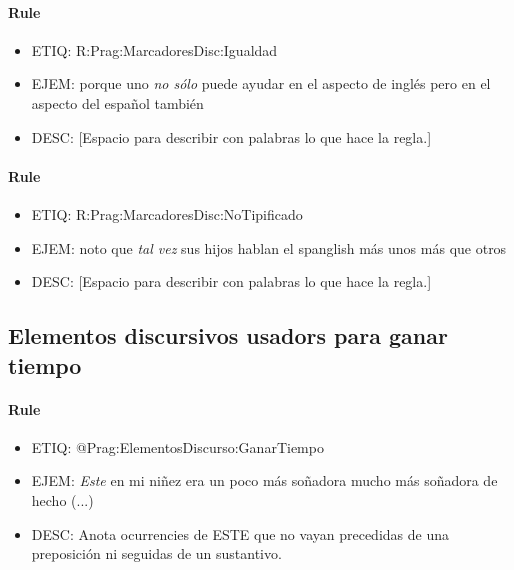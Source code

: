 \documentclass[11pt]{report}
\begin{document}
\paragraph*{Rule}
\begin{itemize}
\item ETIQ: R:Prag:MarcadoresDisc:Igualdad
\item EJEM: porque uno \emph{no sólo} puede ayudar en el aspecto de inglés pero en el aspecto del español también
\item DESC: [Espacio para describir con palabras lo que hace la regla.]
\end{itemize}

\paragraph*{Rule}
\begin{itemize}
\item ETIQ: R:Prag:MarcadoresDisc:NoTipificado
\item EJEM: noto que \emph{tal vez} sus hijos hablan el spanglish más unos más que otros
\item DESC: [Espacio para describir con palabras lo que hace la regla.]
\end{itemize}

\subsection{Elementos discursivos usadors para ganar tiempo}
\paragraph*{Rule}
\begin{itemize}
\item ETIQ: @Prag:ElementosDiscurso:GanarTiempo
\item EJEM: \emph{Este} en mi niñez era un poco más soñadora mucho más soñadora de hecho (...)
\item DESC: Anota ocurrencies de ESTE que no vayan precedidas de una preposición ni seguidas de un sustantivo.
\end{itemize}
\end{document}
